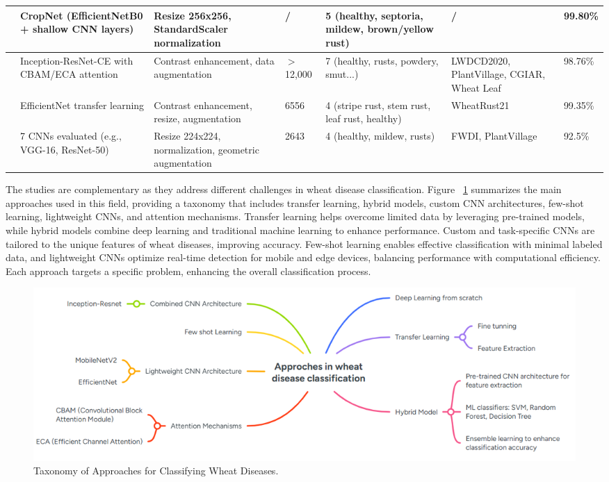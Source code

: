 \begin{table}[htbp]
{\begin{tabular}{|p{2cm}|p{6cm}|p{4.5cm}|p{1.5cm}|p{3.5cm}|p{2.5cm}|p{2cm}|}
    \hline
    \parencite{jouini2024wheat} & CropNet (EfficientNetB0 + shallow CNN layers) & Resize 256x256, StandardScaler normalization & / & 5 (healthy, septoria, mildew, brown/yellow rust) & / & 99.80\% \\
    \hline
    \parencite{fang2023lightweight} & Inception-ResNet-CE with CBAM/ECA attention & Contrast enhancement, data augmentation & $>$12,000 & 7 (healthy, rusts, powdery, smut...) & LWDCD2020, PlantVillage, CGIAR, Wheat Leaf & 98.76\% \\
    \hline
    \parencite{nigam2023deep} & EfficientNet transfer learning & Contrast enhancement, resize, augmentation & 6556 & 4 (stripe rust, stem rust, leaf rust, healthy) & WheatRust21 & 99.35\% \\
    \hline
    \parencite{jiang2022evaluation} & 7 CNNs evaluated (e.g., VGG-16, ResNet-50) & Resize 224x224, normalization, geometric augmentation & 2643 & 4 (healthy, mildew, rusts) & FWDI, PlantVillage & 92.5\% \\
    \hline
    \end{tabular}%
    }
    \label{tab:wheat-disease-related-work}
\end{table}
    


The studies are complementary as they address different challenges in wheat disease classification. Figure ~\ref{fig:Figure01} summarizes the main approaches used in this field, providing a taxonomy that includes transfer learning, hybrid models, custom CNN architectures, few-shot learning, lightweight CNNs, and attention mechanisms. Transfer learning helps overcome limited data by leveraging pre-trained models, while hybrid models combine deep learning and traditional machine learning to enhance performance. Custom and task-specific CNNs are tailored to the unique features of wheat diseases, improving accuracy. Few-shot learning enables effective classification with minimal labeled data, and lightweight CNNs optimize real-time detection for mobile and edge devices, balancing performance with computational efficiency. Each approach targets a specific problem, enhancing the overall classification process.    

\begin{figure}[H]
    \centering
    \includegraphics[width=1.0\textwidth]{chapters/chapter3/images/Figure09.png}
    \caption{Taxonomy of Approaches for Classifying Wheat Diseases. \protect\parencite{haider2021wheat}}
    \label{fig:Figure01}
\end{figure}


